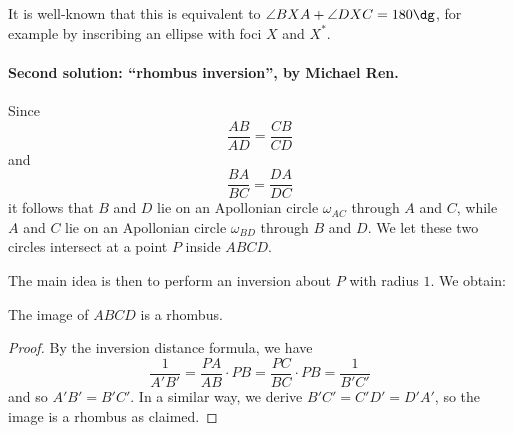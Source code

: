 \documentclass[11pt]{scrartcl}
\begin{document}
It is well-known that this is equivalent to
$\angle BXA + \angle DXC = 180\dg$,
for example by inscribing an ellipse with foci $X$ and $X^\ast$.

\paragraph{Second solution: ``rhombus inversion'', by Michael Ren.}
Since
\[ \frac{AB}{AD} = \frac{CB}{CD} \]
and
\[ \frac{BA}{BC} = \frac{DA}{DC} \]
it follows that $B$ and $D$ lie on an Apollonian circle $\omega_{AC}$
through $A$ and $C$,
while $A$ and $C$ lie on an Apollonian circle $\omega_{BD}$
through $B$ and $D$.
We let these two circles intersect at a point $P$ inside $ABCD$.

The main idea is then to
perform an inversion about $P$ with radius $1$.
We obtain:
\begin{lemma*}
  The image of $ABCD$ is a rhombus.
\end{lemma*}
\begin{proof}
  By the inversion distance formula, we have
  \[ \frac{1}{A'B'} = \frac{PA}{AB} \cdot PB = \frac{PC}{BC} \cdot PB = \frac{1}{B'C'} \]
  and so $A'B' = B'C'$.
  In a similar way, we derive $B'C' = C'D' = D'A'$,
  so the image is a rhombus as claimed.
\end{proof}
\end{document}
